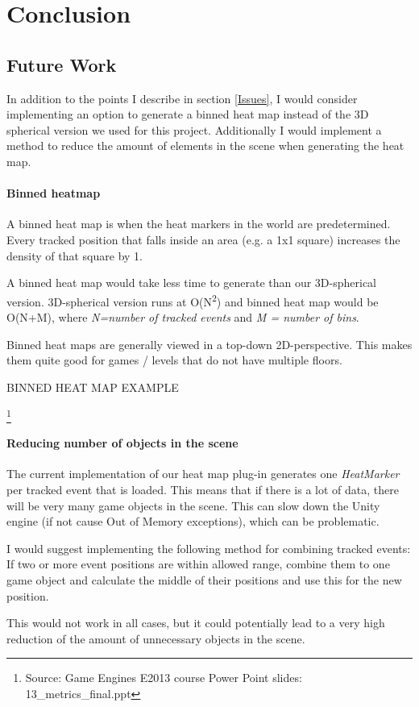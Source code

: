 \section{Conclusion}

\subsection{Future Work}
In addition to the points I describe in section \ref{Issues}, I would consider implementing an option to generate a binned heat map instead of the 3D spherical version we used for this project.  Additionally I would implement a method to reduce the amount of elements in the scene when generating the heat map.
\paragraph{Binned heatmap}
A binned heat map is when the heat markers in the world are predetermined. Every tracked position that falls inside an area (e.g. a 1x1 square) increases the density of that square by 1. 

A binned heat map would take less time to generate than our 3D-spherical version. 3D-spherical version runs at O(N\textsuperscript{2}) and binned heat map would be O(N+M), where \textit{N=number of tracked events} and \textit{M = number of bins}. 

Binned heat maps are generally viewed in a top-down 2D-perspective. This makes them quite good for games / levels that do not have multiple floors.

BINNED HEAT MAP EXAMPLE

\footnote{Source: Game Engines E2013 course Power Point slides: 13\_metrics\_final.ppt}
\paragraph{Reducing number of objects in the scene}
The current implementation of our heat map plug-in generates one \textit{HeatMarker} per tracked event that is loaded. This means that if there is a lot of data, there will be very many game objects in the scene. This can slow down the Unity engine (if not cause Out of Memory exceptions), which can be problematic. 

I would suggest implementing  the following method for combining tracked events: If two or more event positions are within allowed range, combine them to one game object and calculate the middle of their positions and use this for the new position.

This would not work in all cases, but it could potentially lead to a very high reduction of the amount of unnecessary objects in the scene.